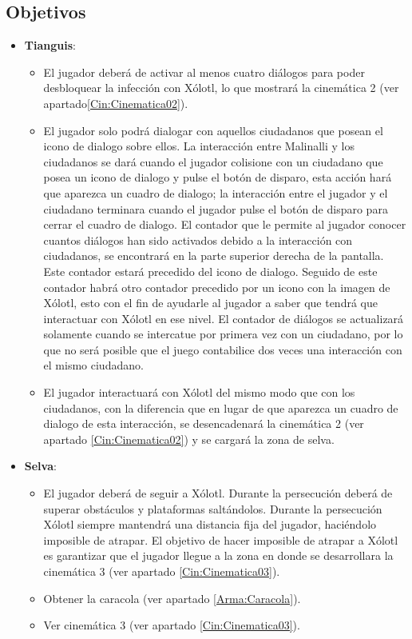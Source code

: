 	\subsection{Objetivos}
\begin{itemize}
	\item \textbf{Tianguis}:
	\begin{itemize}
		\item El jugador deberá de activar al menos cuatro diálogos para poder desbloquear la infección con Xólotl, lo que mostrará la cinemática 2 (ver apartado\ref{Cin:Cinematica02}).	
		\item El jugador solo podrá dialogar con aquellos ciudadanos que posean el icono de dialogo sobre ellos. La interacción entre Malinalli y los ciudadanos se dará cuando el jugador colisione con un ciudadano que posea un icono de dialogo y pulse el botón de disparo, esta acción hará que aparezca un cuadro de dialogo; la interacción entre el jugador y el ciudadano terminara cuando el jugador pulse el botón de disparo para cerrar el cuadro de dialogo. El contador  que le permite al jugador conocer cuantos diálogos han sido activados debido a la interacción con ciudadanos, se encontrará en la parte superior derecha de la pantalla. Este contador estará precedido del icono de dialogo. Seguido de este contador habrá otro contador precedido por un icono con la imagen de Xólotl, esto con el fin de ayudarle al jugador a saber que tendrá que interactuar con Xólotl en ese nivel. El contador de diálogos se actualizará solamente cuando se intercatue por primera vez con un ciudadano, por lo que no será posible que el juego contabilice dos veces una interacción con el mismo ciudadano. 
		\item El jugador interactuará con Xólotl del mismo modo que con los ciudadanos, con la diferencia que en lugar de que aparezca un cuadro de dialogo de esta interacción, se desencadenará la cinemática 2 (ver apartado \ref{Cin:Cinematica02}) y se cargará la zona de selva.
	\end{itemize}
				
	\item \textbf{Selva}: 
		\begin{itemize}
			\item 	El jugador deberá de seguir a Xólotl. Durante la persecución deberá de superar obstáculos y plataformas saltándolos. Durante la persecución Xólotl siempre mantendrá una distancia fija del jugador, haciéndolo imposible de atrapar. El objetivo de hacer imposible de atrapar a Xólotl es garantizar que el jugador llegue a la zona en donde se desarrollara la cinemática 3  (ver apartado \ref{Cin:Cinematica03}).
			\item Obtener la caracola (ver apartado \ref{Arma:Caracola}).
			\item Ver cinemática 3 (ver apartado \ref{Cin:Cinematica03}).
	\end{itemize}
\end{itemize}
